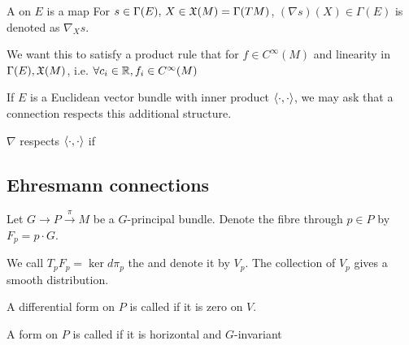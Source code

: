 \documentclass{article}
\begin{document}
\begin{definition}
A  on $E$ is a map 
For $s \in \Gamma(E), \, X \in \mathfrak{X}(M) = \Gamma(TM)$,
$(\nabla s)(X) \in \Gamma(E)$ is denoted as $\nabla_X s$. 
\end{definition}

We want this to satisfy a product rule that for $f \in C^\infty(M)$ 
and linearity in $\Gamma(E), \mathfrak{X}(M)$, i.e. $\forall c_i \in \mathbb{R}, f_i \in C^\infty(M)$

If $E$ is a Euclidean vector bundle with inner product $\left\langle \cdot, \cdot \right\rangle$, we may ask that a connection respects this additional structure. 

\begin{definition}
$\nabla$ respects  $\left\langle \cdot, \cdot \right\rangle$ if 
\end{definition}

\subsection{Ehresmann connections}

\begin{notation}
Let $G \to P \overset{\pi}{\to} M$ be a $G$-principal bundle. Denote the fibre through $p \in P$ by $F_p = p\cdot G$.
\end{notation}

\begin{definition}
	We call $T_p F_p = \ker d\pi_p$ the  and denote it by $V_p$. The collection of $V_p$ gives a smooth distribution. 
\end{definition}

\begin{definition}
	A differential form on $P$ is called  if it is zero on $V$. 
\end{definition}

\begin{definition}
	A form on $P$ is called  if it is horizontal and $G$-invariant 
\end{definition}
\end{document}
